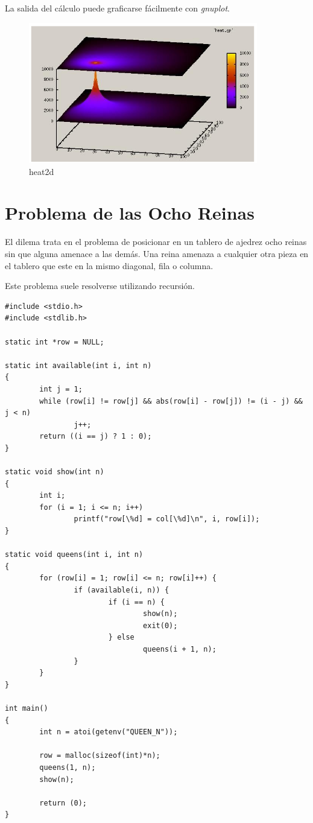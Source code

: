 \documentclass[a4paper]{report}
\begin{document}
La salida del c\'alculo puede graficarse f\'acilmente con {\it gnuplot}.

\begin{figure}[H]
\begin{center}
\includegraphics[width=10cm]{heat2d.png}
\caption{heat2d}
\end{center}
\end{figure}

\section{Problema de las Ocho Reinas}

El dilema trata en el problema de posicionar en un tablero de ajedrez ocho
reinas sin que alguna amenace a las dem\'as. Una reina amenaza a cualquier otra
pieza en el tablero que este en la mismo diagonal, fila o columna.

\bigskip

Este problema suele resolverse utilizando recursi\'on.

\begin{verbatim}
#include <stdio.h>
#include <stdlib.h>

static int *row = NULL;

static int available(int i, int n)
{
        int j = 1;
        while (row[i] != row[j] && abs(row[i] - row[j]) != (i - j) && j < n)
                j++;
        return ((i == j) ? 1 : 0);
}

static void show(int n)
{
        int i;
        for (i = 1; i <= n; i++)
                printf("row[\%d] = col[\%d]\n", i, row[i]);
}

static void queens(int i, int n)
{
        for (row[i] = 1; row[i] <= n; row[i]++) {
                if (available(i, n)) {
                        if (i == n) {
                                show(n);
                                exit(0);
                        } else
                                queens(i + 1, n);
                }
        }
}

int main()
{
        int n = atoi(getenv("QUEEN_N"));

        row = malloc(sizeof(int)*n);
        queens(1, n);
        show(n);

        return (0);
}
\end{verbatim}
\end{document}
